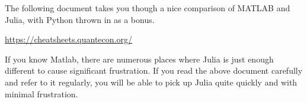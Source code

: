 

\begin{tcolorbox}[title=\textbf{\Large Command Comparison Side by Side:}]


The following document takes you though a nice comparison of MATLAB and Julia, with Python thrown in as a bonus.

\vspace*{.2cm}
\begin{center}
\url{https://cheatsheets.quantecon.org/}
\end{center}
\vspace*{.2cm}

If you know Matlab, there are numerous places where Julia is just enough different to cause significant frustration. If you read the above document carefully and refer to it regularly, you will be able to pick up Julia quite quickly and with minimal frustration.


\end{tcolorbox}

\vspace*{.2cm}

